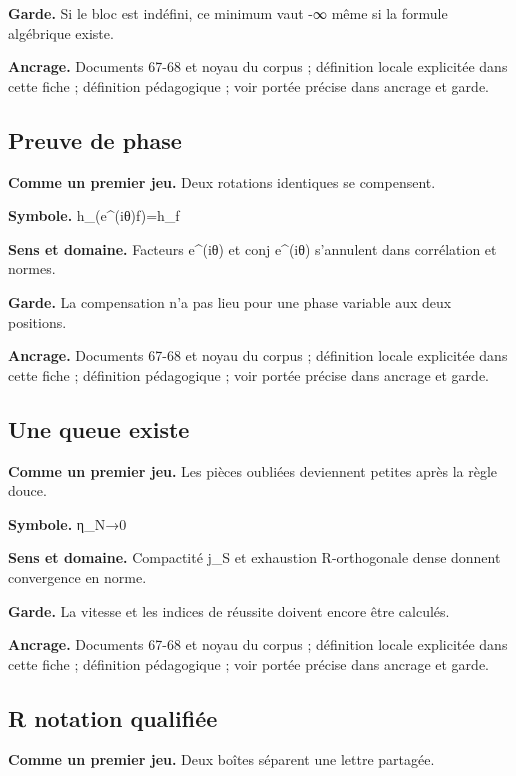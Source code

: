 \documentclass[
  9pt,
  a4paper,
]{article}
\begin{document}
\textbf{Garde.} Si le bloc est indéfini, ce minimum vaut -∞ même si la
formule algébrique existe.

\textbf{Ancrage.} Documents 67-68 et noyau du corpus ; définition locale
explicitée dans cette fiche ; définition pédagogique ; voir portée
précise dans ancrage et garde.

\hypertarget{preuve-de-phase}{%
\subsection{Preuve de phase}\label{preuve-de-phase}}

\textbf{Comme un premier jeu.} Deux rotations identiques se compensent.

\textbf{Symbole.} h\_(e\^{}(iθ)f)=h\_f

\textbf{Sens et domaine.} Facteurs e\^{}(iθ) et conj e\^{}(iθ)
s'annulent dans corrélation et normes.

\textbf{Garde.} La compensation n'a pas lieu pour une phase variable aux
deux positions.

\textbf{Ancrage.} Documents 67-68 et noyau du corpus ; définition locale
explicitée dans cette fiche ; définition pédagogique ; voir portée
précise dans ancrage et garde.

\hypertarget{une-queue-existe}{%
\subsection{Une queue existe}\label{une-queue-existe}}

\textbf{Comme un premier jeu.} Les pièces oubliées deviennent petites
après la règle douce.

\textbf{Symbole.} η\_N→0

\textbf{Sens et domaine.} Compactité j\_S et exhaustion R-orthogonale
dense donnent convergence en norme.

\textbf{Garde.} La vitesse et les indices de réussite doivent encore
être calculés.

\textbf{Ancrage.} Documents 67-68 et noyau du corpus ; définition locale
explicitée dans cette fiche ; définition pédagogique ; voir portée
précise dans ancrage et garde.

\hypertarget{r-notation-qualifiuxe9e}{%
\subsection{R notation qualifiée}\label{r-notation-qualifiuxe9e}}

\textbf{Comme un premier jeu.} Deux boîtes séparent une lettre partagée.
\end{document}
